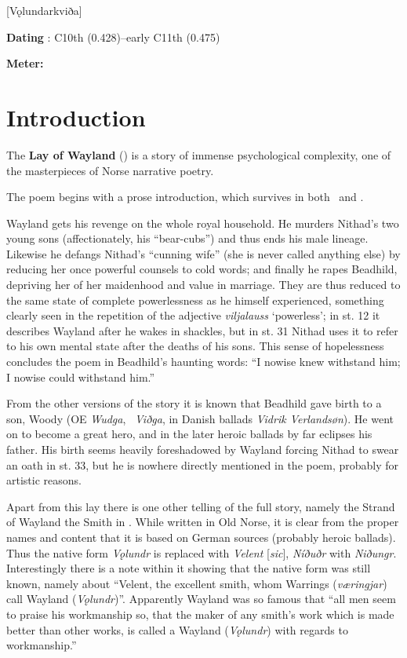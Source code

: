[Vǫlundarkviða]

\begin{flushright}%
\textbf{Dating} \parencite{Sapp2022}: C10th (0.428)–early C11th (0.475)

\textbf{Meter:} \Fornyrdislag%
\end{flushright}%

\section{Introduction}

The \textbf{Lay of Wayland} (\Volundarkvida) is a story of immense psychological complexity, one of the masterpieces of Norse narrative poetry.

The poem begins with a prose introduction, which survives in both \Regius\ and \AM.

Wayland gets his revenge on the whole royal household. He murders Nithad’s two young sons (affectionately, his “bear-cubs”) and thus ends his male lineage. Likewise he defangs Nithad’s “cunning wife” (she is never called anything else) by reducing her once powerful counsels to cold words; and finally he rapes Beadhild, depriving her of her maidenhood and value in marriage. They are thus reduced to the same state of complete powerlessness as he himself experienced, something clearly seen in the repetition of the adjective \emph{viljalauss} ‘powerless’; in st. 12 it describes Wayland after he wakes in shackles, but in st. 31 Nithad uses it to refer to his own mental state after the deaths of his sons. This sense of hopelessness concludes the poem in Beadhild’s haunting words: “I nowise knew withstand him; I nowise could withstand him.”

From the other versions of the story it is known that Beadhild gave birth to a son, Woody (OE \emph{Wudga}, \ThidreksSaga\ \emph{Viðga}, in Danish ballads \emph{Vidrik Verlandsøn}). He went on to become a great hero, and in the later heroic ballads by far eclipses his father. His birth seems heavily foreshadowed by Wayland forcing Nithad to swear an oath in st. 33, but he is nowhere directly mentioned in the poem, probably for artistic reasons.

Apart from this lay there is one other telling of the full story, namely the Strand of Wayland the Smith in \ThidreksSaga. While written in Old Norse, it is clear from the proper names and content that it is based on German sources (probably heroic ballads). Thus the native form \emph{Vǫlundr} is replaced with \emph{Velent} [\emph{sic}], \emph{Níðuðr} with \emph{Niðungr}. Interestingly there is a note within it showing that the native form was still known, namely about “Velent, the excellent smith, whom Warrings (\emph{væringjar}) call Wayland (\emph{Vǫlundr})”. Apparently Wayland was so famous that “all men seem to praise his workmanship so, that the maker of any smith’s work which is made better than other works, is called a Wayland (\emph{Vǫlundr}) with regards to workmanship.”

